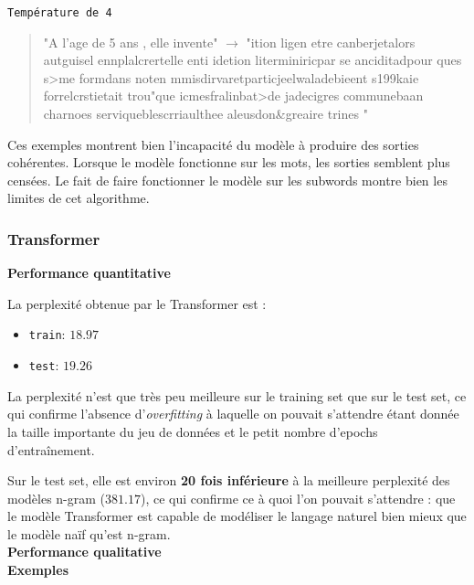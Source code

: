 \noindent{} \texttt{Température de 4}


  \begin{quotation}
  "A l'age de 5 ans , elle invente" $\rightarrow$ "ition ligen etre canberjetalors autguisel ennplalcrertelle enti idetion literminiricpar se anciditadpour ques s>me formdans noten mmisdirvaretparticjeelwaladebieent s199kaie forrelcrstietait trou"que icmesfralinbat>de jadecigres communebaan charnoes serviqueblescrriaulthee aleusdon\&greaire trines "
  \end{quotation}



Ces exemples montrent bien l'incapacité du modèle à produire des sorties
cohérentes. Lorsque le modèle fonctionne sur les mots, les sorties
semblent plus censées. Le fait de faire fonctionner le modèle sur les
subwords montre bien les limites de cet algorithme.

\hypertarget{transformer}{%
\subsubsection{Transformer}\label{transformer}}

\noindent{}\textbf{Performance quantitative}

La perplexité obtenue par le Transformer est :

\begin{itemize}
\item
  \texttt{train}: \(18.97\)
\item
  \texttt{test}: \(19.26\)
\end{itemize}

La perplexité n'est que très peu meilleure sur le training set que sur
le test set, ce qui confirme l'absence d'\emph{overfitting} à laquelle
on pouvait s'attendre étant donnée la taille importante du jeu de
données et le petit nombre d'epochs d'entraînement.

Sur le test set, elle est environ \textbf{20 fois inférieure} à la
meilleure perplexité des modèles n-gram (\(381.17\)), ce qui confirme ce
à quoi l'on pouvait s'attendre : que le modèle Transformer est capable
de modéliser le langage naturel bien mieux que le modèle naïf qu'est
n-gram. \\

\noindent{}\textbf{Performance qualitative} \\

\textbf{Exemples} \\

